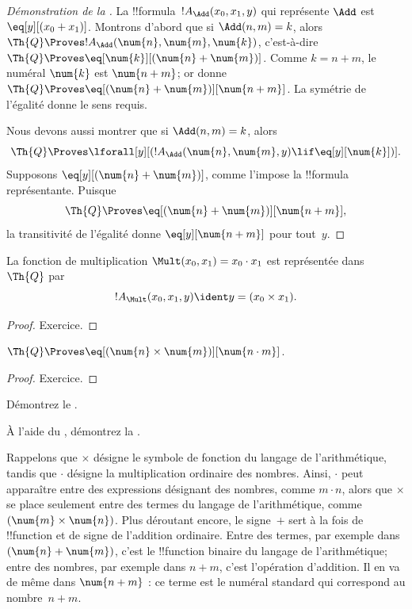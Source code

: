 \documentclass[../../../include/open-logic-section]{subfiles}
\begin{document}
\begin{proof}[Démonstration de la ]
La !!{formula}~$!A_\Add(x_0,x_1,y)$ qui représente $\Add$ est
$\eq[y][(x_0+x_1)]$. Montrons d'abord que si $\Add(n,m)=k$,
alors $\Th{Q}\Proves !A_\Add(\num{n},\num{m},\num{k})$,
c'est-à-dire $\Th{Q}\Proves\eq[\num{k}][(\num{n}+\num{m})]$.
Comme $k=n+m$, le numéral $\num{k}$ est $\num{n+m}$; or
 donne
$\Th{Q}\Proves\eq[(\num{n}+\num{m})][\num{n+m}]$.
La symétrie de l'égalité donne le sens requis.

Nous devons aussi montrer que si $\Add(n,m)=k$, alors
\[
\Th{Q} \Proves \lforall[y][(!A_\Add(\num{n}, \num{m}, y) \lif
  \eq[y][\num{k}])].
\]
Supposons $\eq[y][(\num{n}+\num{m})]$, comme l'impose la
!!{formula} représentante. Puisque
\[
\Th{Q} \Proves \eq[(\num{n}+\num{m})][\num{n+m}],
\]
la transitivité de l'égalité donne
$\eq[y][\num{n+m}]$ pour tout~$y$.
\end{proof}

\begin{prop}
La fonction de multiplication
$\Mult(x_0,x_1)=x_0\cdot x_1$ est représentée dans~$\Th{Q}$ par
\[
  !A_{\Mult}(x_0, x_1, y) \ident y = (x_0 \times x_1).
\]
\end{prop}

\begin{proof} Exercice. \end{proof}

\begin{lem}
$\Th{Q}\Proves\eq[(\num{n}\times\num{m})][\num{n\cdot m}]$.
\end{lem}

\begin{proof} Exercice. \end{proof}

\begin{prob}
Démontrez le .
\end{prob}

\begin{prob}
À l'aide du , démontrez la
.
\end{prob}

\begin{explain}
  Rappelons que $\times$ désigne le symbole de fonction du
  langage de l'arithmétique, tandis que $\cdot$ désigne la
  multiplication ordinaire des nombres. Ainsi, $\cdot$ peut
  apparaître entre des expressions désignant des nombres, comme
  $m\cdot n$, alors que $\times$ se place seulement entre des
  termes du langage de l'arithmétique, comme
  $(\num{m}\times\num{n})$. Plus déroutant encore, le signe~$+$
  sert à la fois de !!{function} et de signe de
  l'addition ordinaire. Entre des termes, par exemple dans
  $(\num{n}+\num{m})$, c'est le !!{function} binaire
  du langage de l'arithmétique; entre des nombres, par exemple
  dans $n+m$, c'est l'opération d'addition. Il en va de même
  dans $\num{n+m}$ : ce terme est le numéral standard qui
  correspond au nombre~$n+m$.
\end{explain}
\end{document}
